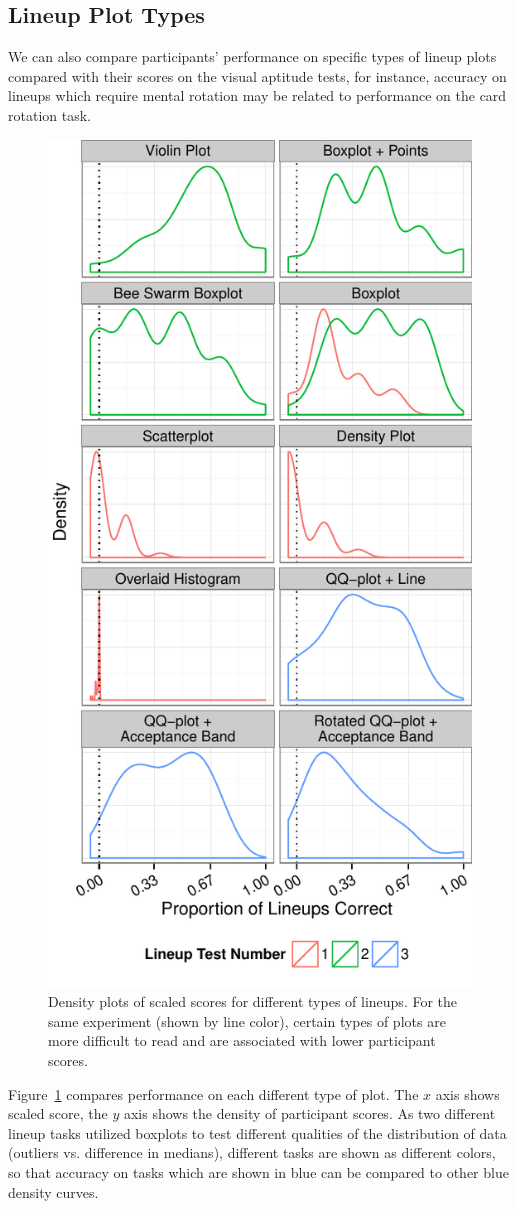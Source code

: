 \documentclass[11pt]{isuthesis}\usepackage[]{graphicx}\usepackage[]{color}
\begin{document}
\subsection{Lineup Plot Types} \label{app:plottypes}
We can also compare participants' performance on specific types of lineup plots compared with their scores on the visual aptitude tests, for instance, accuracy on lineups which require mental rotation may be related to performance on the card rotation task. 



\begin{figure}[ht]\centering
\includegraphics[width=.45\linewidth]{fig-lineup-types-1}
\caption[Density plots of scaled scores for different types of lineups]{Density plots of scaled scores for different types of lineups. For the same experiment (shown by line color), certain types of plots are more difficult to read and are associated with lower participant scores. \label{fig:plottypesdensity}}
\end{figure}

Figure~\ref{fig:plottypesdensity} compares performance on each different type of plot. The $x$ axis shows scaled score, the $y$ axis shows the density of participant scores. As two different lineup tasks utilized boxplots to test different qualities of the distribution of data (outliers vs. difference in medians), different tasks are shown as different colors, so that accuracy on tasks which are shown in blue can be compared to other blue density curves. 
\end{document}
